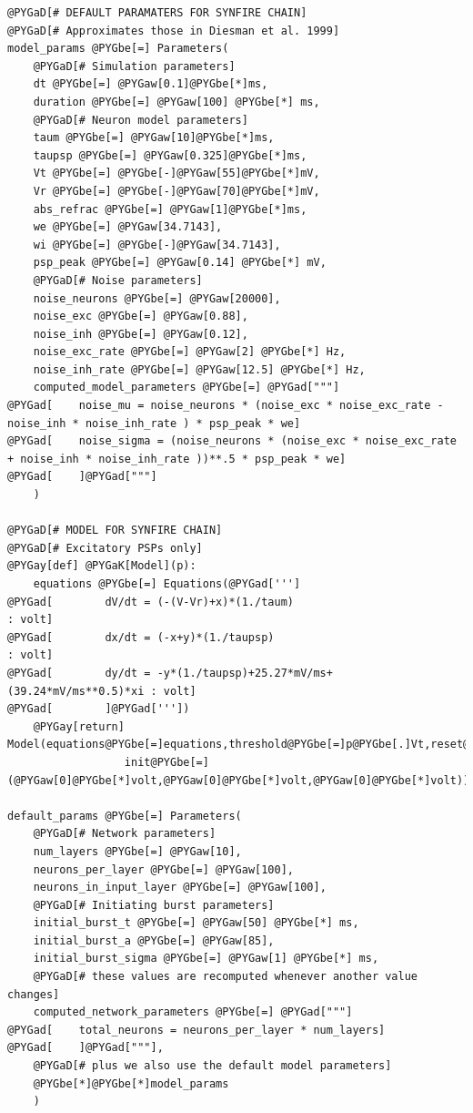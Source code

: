 \documentclass[letterpaper,10pt]{manual}
\begin{document}
\begin{Verbatim}[commandchars=@\[\]]
@PYGaD[# DEFAULT PARAMATERS FOR SYNFIRE CHAIN]
@PYGaD[# Approximates those in Diesman et al. 1999]
model_params @PYGbe[=] Parameters(
    @PYGaD[# Simulation parameters]
    dt @PYGbe[=] @PYGaw[0.1]@PYGbe[*]ms,
    duration @PYGbe[=] @PYGaw[100] @PYGbe[*] ms,
    @PYGaD[# Neuron model parameters]
    taum @PYGbe[=] @PYGaw[10]@PYGbe[*]ms,
    taupsp @PYGbe[=] @PYGaw[0.325]@PYGbe[*]ms,
    Vt @PYGbe[=] @PYGbe[-]@PYGaw[55]@PYGbe[*]mV,
    Vr @PYGbe[=] @PYGbe[-]@PYGaw[70]@PYGbe[*]mV,
    abs_refrac @PYGbe[=] @PYGaw[1]@PYGbe[*]ms,
    we @PYGbe[=] @PYGaw[34.7143],
    wi @PYGbe[=] @PYGbe[-]@PYGaw[34.7143],
    psp_peak @PYGbe[=] @PYGaw[0.14] @PYGbe[*] mV,
    @PYGaD[# Noise parameters]
    noise_neurons @PYGbe[=] @PYGaw[20000],
    noise_exc @PYGbe[=] @PYGaw[0.88],
    noise_inh @PYGbe[=] @PYGaw[0.12],
    noise_exc_rate @PYGbe[=] @PYGaw[2] @PYGbe[*] Hz,
    noise_inh_rate @PYGbe[=] @PYGaw[12.5] @PYGbe[*] Hz,
    computed_model_parameters @PYGbe[=] @PYGad["""]
@PYGad[    noise_mu = noise_neurons * (noise_exc * noise_exc_rate - noise_inh * noise_inh_rate ) * psp_peak * we]
@PYGad[    noise_sigma = (noise_neurons * (noise_exc * noise_exc_rate + noise_inh * noise_inh_rate ))**.5 * psp_peak * we]
@PYGad[    ]@PYGad["""]
    )

@PYGaD[# MODEL FOR SYNFIRE CHAIN]
@PYGaD[# Excitatory PSPs only]
@PYGay[def] @PYGaK[Model](p):
    equations @PYGbe[=] Equations(@PYGad[''']
@PYGad[        dV/dt = (-(V-Vr)+x)*(1./taum)                            : volt]
@PYGad[        dx/dt = (-x+y)*(1./taupsp)                               : volt]
@PYGad[        dy/dt = -y*(1./taupsp)+25.27*mV/ms+(39.24*mV/ms**0.5)*xi : volt]
@PYGad[        ]@PYGad['''])
    @PYGay[return] Model(equations@PYGbe[=]equations,threshold@PYGbe[=]p@PYGbe[.]Vt,reset@PYGbe[=]p@PYGbe[.]Vr,refractory@PYGbe[=]p@PYGbe[.]abs_refrac,\
                  init@PYGbe[=](@PYGaw[0]@PYGbe[*]volt,@PYGaw[0]@PYGbe[*]volt,@PYGaw[0]@PYGbe[*]volt))

default_params @PYGbe[=] Parameters(
    @PYGaD[# Network parameters]
    num_layers @PYGbe[=] @PYGaw[10],
    neurons_per_layer @PYGbe[=] @PYGaw[100],
    neurons_in_input_layer @PYGbe[=] @PYGaw[100],
    @PYGaD[# Initiating burst parameters]
    initial_burst_t @PYGbe[=] @PYGaw[50] @PYGbe[*] ms,
    initial_burst_a @PYGbe[=] @PYGaw[85],
    initial_burst_sigma @PYGbe[=] @PYGaw[1] @PYGbe[*] ms,
    @PYGaD[# these values are recomputed whenever another value changes]
    computed_network_parameters @PYGbe[=] @PYGad["""]
@PYGad[    total_neurons = neurons_per_layer * num_layers]
@PYGad[    ]@PYGad["""],
    @PYGaD[# plus we also use the default model parameters]
    @PYGbe[*]@PYGbe[*]model_params
    )


\end{Verbatim}
\end{document}
